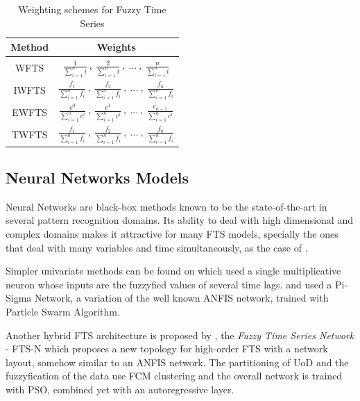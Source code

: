 \begin{table}[htb]
\begin{center}
\begin{tabular}{|c|c|}  \hline
\textbf{Method} & \textbf{Weights} \\ \hline
WFTS & $\frac{1}{\sum_{i = 1}^n i}\ ,\ \frac{2}{\sum_{i = 1}^n i}\ ,\ ...\ ,\ \frac{n}{\sum_{i = 1}^n i}$ \\ \hline
IWFTS & $\frac{f_1}{\sum_{i = 1}^n f_i}\ ,\ \frac{f_2}{\sum_{i = 1}^n f_i}\ ,\ ...\ ,\ \frac{f_n}{\sum_{i = 1}^n f_i}$ \\ \hline
EWFTS & $\frac{c^0}{\sum_{i = 1}^n c^i}\ ,\ \frac{c^1}{\sum_{i = 1}^n c^i}\ ,\ ...\ ,\ \frac{c_{n-1}}{\sum_{i = 1}^n c^i}$ \\ \hline
TWFTS & $\frac{f_1}{\sum_{i = 1}^n f_i}\ ,\ \frac{f_2}{\sum_{i = 1}^n f_i}\ ,\ ...\ ,\ \frac{f_n}{\sum_{i = 1}^n f_i}$ \\ \hline
\end{tabular}
\end{center}
\caption{Weighting schemes for Fuzzy Time Series}
\label{tab:wfts}
\end{table}

%
\subsection{Neural Networks Models}
\label{sec:fts_neural}

Neural Networks are black-box methods known to be the state-of-the-art in several pattern recognition domains. Its ability to deal with high dimensional and complex domains makes it attractive for many FTS models, specially the ones that deal with many variables and time simultaneously, as the case of \cite{Egrioglu2009}.

Simpler univariate methods can be found on \cite{Yolcu2017} which used a single multiplicative neuron whose inputs are the fuzzyfied values of several time lags. \cite{Bas2015} and \cite{Bas2018} used a Pi-Sigma Network, a variation of the well known ANFIS network, trained with Particle Swarm Algorithm.

Another hybrid FTS architecture is proposed by \cite{Bas2015}, the \textit{Fuzzy Time Series Network} - FTS-N which proposes a new topology for high-order FTS with a network layout, somehow similar to an ANFIS network. The partitioning of UoD and the fuzzyfication of the data use FCM clustering and the overall network is trained with PSO, combined yet with an autoregressive layer.

